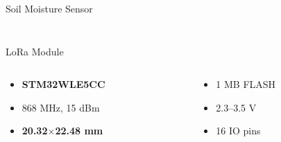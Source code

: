 \documentclass[hyphens]{beamer}
\begin{document}
\begin{frame}{Soil Moisture Sensor}
\begin{columns}[T]
\begin{column}{.5\textwidth}
\begin{figure}
    \end{figure}
\end{column}
\end{columns}
\end{frame}


\begin{frame}{LoRa Module}
\begin{figure}
    \centering
    \small
    
\end{figure}
\begin{columns}[T]
\begin{column}{.5\textwidth}
    \begin{itemize}
        \item \textbf{STM32WLE5CC}
        \item 868 MHz, 15 dBm
        \item \textbf{20.32}$\mathbf{\times}$\textbf{22.48 mm}
    \end{itemize}
\end{column}
\hfill
\begin{column}{.5\textwidth}
    \begin{itemize}
        \item 1 MB FLASH
        \item 2.3--3.5 V
        \item 16 IO pins
    \end{itemize}
\end{column}
\end{columns}
\end{frame}
\end{document}
